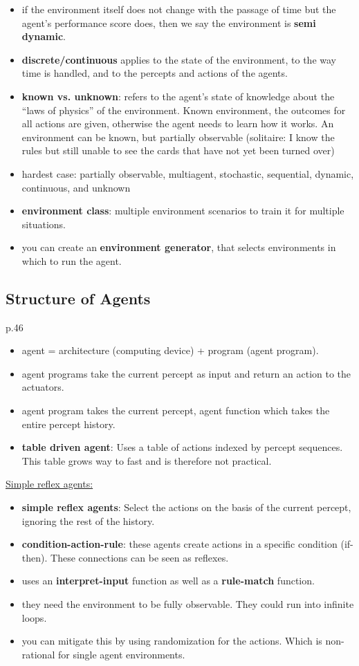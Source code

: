 \begin{itemize}[noitemsep,nolistsep]
	\item if the environment itself does not change with the passage of time but the agent’s performance score does, then we say the environment is \textbf{semi dynamic}.
	\item \textbf{discrete/continuous} applies to the state of the environment, to the way time is handled, and to the percepts and actions of the agents.
	\item \textbf{known vs. unknown}: refers to the agent’s state of knowledge about the “laws of physics” of the environment. Known environment, the outcomes for all actions are given, otherwise the agent needs to learn how it works. An environment can be known, but partially observable (solitaire: I know the rules but still unable to see the cards that have not yet been turned over)
	\item hardest case: partially observable, multiagent, stochastic, sequential, dynamic, continuous, and unknown
	\item \textbf{environment class}: multiple environment scenarios to train it for multiple situations.
	\item you can create an \textbf{environment generator}, that selects environments in which to run the agent.
\end{itemize}

\subsection{Structure of Agents}
p.46
\begin{itemize}[noitemsep,nolistsep]
	\item agent = architecture (computing device) + program (agent program).
	\item agent programs take the current percept as input and return an action to the actuators.
	\item agent program takes the current percept, agent function which takes the entire percept history.
	\item \textbf{table driven agent}: Uses a table of actions indexed by percept sequences. This table grows way to fast and is therefore not practical.
\end{itemize}

\underline{Simple reflex agents:}
\begin{itemize}[noitemsep,nolistsep]
	\item \textbf{simple reflex agents}: Select the actions on the basis of the current percept, ignoring the rest of the history.
	\item \textbf{condition-action-rule}: these agents create actions in a specific condition (if-then). These connections can be seen as reflexes.
	\item uses an \textbf{interpret-input} function as well as a \textbf{rule-match} function.
	\item they need the environment to be fully observable. They could run into infinite loops.
	\item you can mitigate this by using randomization for the actions. Which is non-rational for single agent environments.
\end{itemize}

